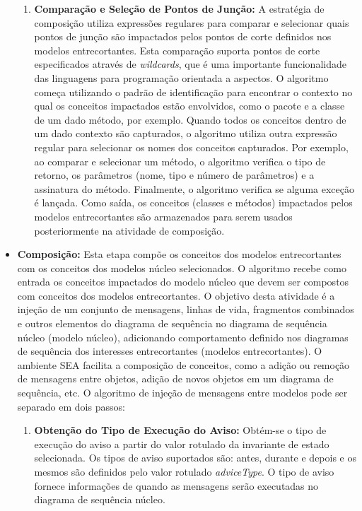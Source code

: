 \begin{itemize}
\begin{enumerate}
	    \item \textbf{Comparação e Seleção de Pontos de Junção:} A estratégia de composição utiliza expressões regulares para comparar e selecionar
	    quais pontos de junção são impactados pelos pontos de corte definidos nos modelos entrecortantes. Esta comparação suporta pontos de corte
	    especificados através de \textit{wildcards}, que é uma importante funcionalidade das linguagens para programação orientada a aspectos. O
	    algoritmo começa utilizando o padrão de identificação para encontrar o contexto no qual os conceitos impactados estão envolvidos, como o pacote e
	    a classe de um dado método, por exemplo. Quando todos os conceitos dentro de um dado contexto são capturados, o algoritmo utiliza outra expressão
	    regular para selecionar os nomes dos conceitos capturados. Por exemplo, ao comparar e selecionar um método, o algoritmo verifica o tipo de
	    retorno, os parâmetros (nome, tipo e número de parâmetros) e a assinatura do método. Finalmente, o algoritmo verifica se alguma exceção é
	    lançada. Como saída, os conceitos (classes e métodos) impactados pelos modelos entrecortantes são armazenados para serem usados posteriormente na
	    atividade de composição.
	  \end{enumerate}  
	  
	  \item \textbf{Composição:} Esta etapa compõe os conceitos dos modelos entrecortantes com os conceitos dos modelos núcleo selecionados. O algoritmo
	  recebe como entrada os conceitos impactados do modelo núcleo que devem ser compostos com conceitos dos modelos entrecortantes. O objetivo desta
	  atividade é a injeção de um conjunto de mensagens, linhas de vida, fragmentos combinados e outros elementos do diagrama de sequência no diagrama de
	  sequência núcleo (modelo núcleo), adicionando comportamento definido nos diagramas de sequência dos interesses entrecortantes (modelos
	  entrecortantes). O ambiente SEA facilita a composição de conceitos, como a adição ou remoção de mensagens entre objetos, adição de novos objetos em
	  um diagrama de sequência, etc. O algoritmo de injeção de mensagens entre modelos pode ser separado em dois passos:
	  
		  \begin{enumerate}
		    
		    \item \textbf{Obtenção do Tipo de Execução do Aviso:} Obtém-se o tipo de execução do aviso a partir do valor rotulado da invariante de estado
		    selecionada. Os tipos de aviso suportados são: antes, durante e depois e os mesmos são definidos pelo valor rotulado \textit{adviceType}. O tipo
		    de aviso fornece informações de quando as mensagens serão executadas no diagrama de sequência núcleo.


\end{enumerate}
\end{itemize}
